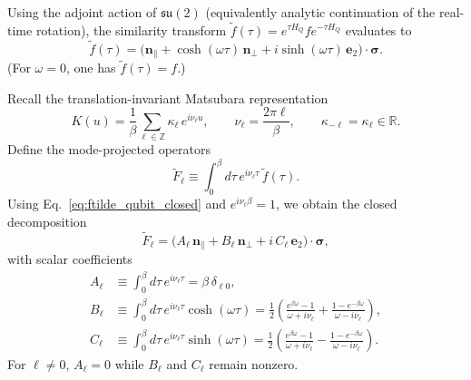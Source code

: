 Using the adjoint action of $\mathfrak{su}(2)$ (equivalently analytic continuation of the real-time rotation),
the similarity transform $\tilde f(\tau)=e^{\tau H_Q} f e^{-\tau H_Q}$ evaluates to
\begin{equation}
    \tilde f(\tau)
    =
    \Big(
        \mathbf n_\parallel
        + \cosh(\omega\tau)\,\mathbf n_\perp
        + i\sinh(\omega\tau)\,\mathbf e_2
    \Big)\cdot\boldsymbol\sigma.
    \label{eq:ftilde_qubit_closed}
\end{equation}
(For $\omega=0$, one has $\tilde f(\tau)=f$.)


Recall the translation-invariant Matsubara representation
\begin{equation}
    K(u)=\frac{1}{\beta}\sum_{\ell\in\mathbb Z}\kappa_\ell\,e^{i\nu_\ell u},
    \qquad
    \nu_\ell=\frac{2\pi\ell}{\beta},
    \qquad
    \kappa_{-\ell}=\kappa_\ell\in\mathbb R.
\end{equation}
Define the mode-projected operators
\begin{equation}
    \tilde F_\ell \equiv \int_0^\beta d\tau\,e^{i\nu_\ell\tau}\,\tilde f(\tau).
\end{equation}
Using Eq.~\eqref{eq:ftilde_qubit_closed} and $e^{i\nu_\ell\beta}=1$, we obtain the closed decomposition
\begin{equation}
    \tilde F_\ell
    =
    \Big(
        A_\ell\,\mathbf n_\parallel
        + B_\ell\,\mathbf n_\perp
        + i\,C_\ell\,\mathbf e_2
    \Big)\cdot\boldsymbol\sigma,
    \label{eq:Ftilde_qubit_decomp}
\end{equation}
with scalar coefficients
\begin{align}
    A_\ell
    &\equiv
    \int_0^\beta d\tau\,e^{i\nu_\ell\tau}
    =
    \beta\,\delta_{\ell 0},
    \label{eq:Aell_def}\\[3pt]
    B_\ell
    &\equiv
    \int_0^\beta d\tau\,e^{i\nu_\ell\tau}\cosh(\omega\tau)
    =
    \frac{1}{2}\left(
        \frac{e^{\beta\omega}-1}{\omega+i\nu_\ell}
        +
        \frac{1-e^{-\beta\omega}}{\omega-i\nu_\ell}
    \right),
    \label{eq:Bell_def}\\[3pt]
    C_\ell
    &\equiv
    \int_0^\beta d\tau\,e^{i\nu_\ell\tau}\sinh(\omega\tau)
    =
    \frac{1}{2}\left(
        \frac{e^{\beta\omega}-1}{\omega+i\nu_\ell}
        -
        \frac{1-e^{-\beta\omega}}{\omega-i\nu_\ell}
    \right).
    \label{eq:Cell_def}
\end{align}
For $\ell\neq 0$, $A_\ell=0$ while $B_\ell$ and $C_\ell$ remain nonzero.


